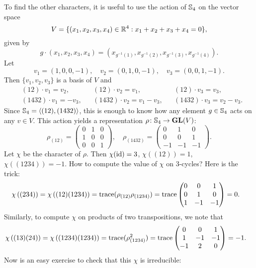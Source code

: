 \begin{example}
To find the other characters, it is useful to use the action of $\mathbb{S}_4$ on the vector space 
	\[
		V=\{(x_1,x_2,x_3,x_4)\in\mathbb{R}^4:x_1+x_2+x_3+x_4=0\},
	\]
given by 
\[
g\cdot (x_1,x_2,x_3,x_4)=(x_{g^{-1}(1)},x_{g^{-1}(2)},x_{g^{-1}(3)},x_{g^{-1}(4)}).
\]
Let \[
		v_1=(1,0,0,-1),
		\quad
		v_2=(0,1,0,-1),
		\quad
		v_3=(0,0,1,-1).
	\]
	Then $\{v_1,v_2,v_3\}$ is a basis of $V$ and 
	\begin{align*}
		&(12)\cdot v_1=v_2,&&
		(12)\cdot v_2=v_1,&&
		(12)\cdot v_3=v_3,\\
		&(1432)\cdot v_1=-v_3,&&
		(1432)\cdot v_2=v_1-v_3,&&
		(1432)\cdot v_3=v_2-v_3.
	\end{align*}
	Since $\mathbb{S}_4=\langle (12),(1432)\rangle$, this 
    is enough to know how any element 
    $g\in\mathbb{S}_4$ acts on any $v\in V$. 
    This action yields a representation 
    $\rho\colon\mathbb{S}_4\to\mathbf{GL}(V)$: 
    \[
		\rho_{(12)}=\begin{pmatrix}
			0 & 1 & 0\\
			1 & 0 & 0\\
			0 & 0 & 1
		\end{pmatrix},\quad
		\rho_{(1432)}=\begin{pmatrix}
			0 & 1 & 0\\
			0 & 0 & 1\\
			-1 & -1 & -1
		\end{pmatrix}.
	\]
    Let $\chi$ be the character of $\rho$.  
	Then 
	$\chi(\operatorname{id})=3$, $\chi\left( (12) \right)=1$, $\chi\left( (1234) \right)=-1$. How to compute the value of $\chi$ on 3-cycles? Here is the trick: 
    \begin{align*}
		&\chi\left( (234) \right)=\chi\left( (12)(1234) \right)=\operatorname{trace}(\rho_{(12)}\rho_{(1234)})=\operatorname{trace}\begin{pmatrix}
			0 & 0 & 1\\
			0 & 1 & 0\\
			1 & -1 & -1
		\end{pmatrix}
		=0.
	\end{align*}
	Similarly, to compute $\chi$ on products of two transpositions, 
    we note that 
    \begin{align*}
		&\chi\left( (13)(24) \right)=\chi\left( (1234)(1234) \right)=\operatorname{trace}(\rho_{(1234)}^2)=\operatorname{trace}\begin{pmatrix}
			0 & 0 & 1\\
			1 & -1 & -1\\
			-1 & 2 & 0
		\end{pmatrix}
		=-1.
	\end{align*}
     Now is an easy exercise to check that this $\chi$ is irreducible:

\end{example}
